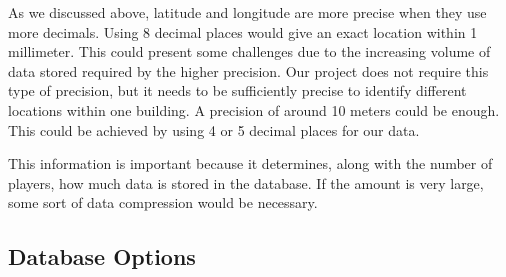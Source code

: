 \documentclass[conference]{IEEEtran}
\begin{document}
As we discussed above, latitude and longitude are more precise when they use more decimals. Using 8 decimal places would give an exact location within 1 millimeter. This could present some challenges due to the increasing volume of data stored required by the higher precision. Our project does not require this type of precision, but it needs to be sufficiently precise to identify different locations within one building. A precision of around 10 meters could be enough. This could be achieved by using 4 or 5 decimal places for our data. 

This information is important because it determines, along with the number of players, how much data is stored in the database. If the amount is very large, some sort of data compression would be necessary.

\subsection{Database Options}
\end{document}
